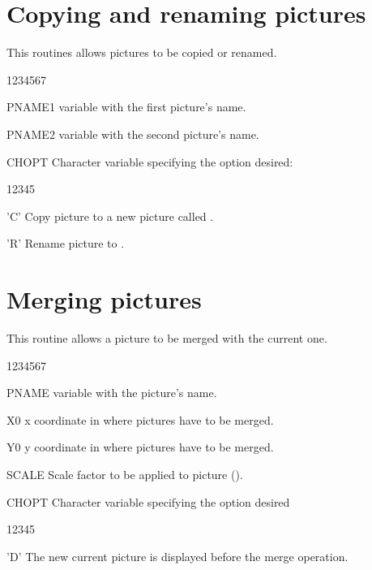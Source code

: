 \section{Copying and renaming pictures}
\Action
This routines allows pictures to be copied or renamed.
\Pdesc
\begin{DLtt}{1234567}
\item[PNAME1]  variable with the first picture's name.
\item[PNAME2]  variable with the second picture's name.
\item[CHOPT] Character variable specifying the option desired:
\begin{DLtt}{12345}
\item['C'] Copy picture  to a new picture called
.
\item['R'] Rename picture  to .
\end{DLtt}
\end{DLtt}
\section{Merging pictures}
\Action
This routine allows a picture to be merged with the current one.
\Pdesc
\begin{DLtt}{1234567}
\item[PNAME]  variable with the picture's name.
\item[X0] x coordinate in \NDC{} where pictures have to be merged.
\item[Y0] y coordinate in \NDC{} where pictures have to be merged.
\item[SCALE] Scale factor to be applied to picture 
().
\item[CHOPT] Character variable specifying the option desired
\begin{DLtt}{12345}
\item['D'] The new current picture is displayed before the merge operation.
\end{DLtt}
\end{DLtt}

\newpage

